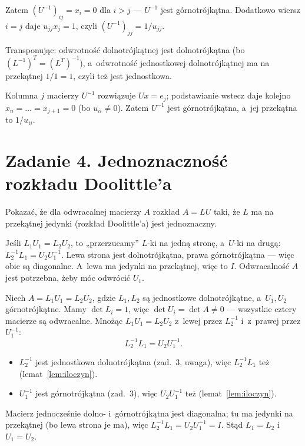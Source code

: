 \documentclass[11pt]{article}
\begin{document}
Zatem $(U^{-1})_{ij}=x_i=0$ dla $i>j$ --- $U^{-1}$ jest górnotrójkątna.
Dodatkowo wiersz $i=j$ daje $u_{jj}x_j=1$, czyli $(U^{-1})_{jj}=1/u_{jj}$.

\begin{uwaga}
Transponując: odwrotność dolnotrójkątnej jest dolnotrójkątna (bo
$(L^{-1})^T=(L^T)^{-1}$), a~odwrotność jednostkowej dolnotrójkątnej
ma na przekątnej $1/1=1$, czyli też jest jednostkowa.
\end{uwaga}

\begin{odpowiedz}
Kolumna $j$ macierzy $U^{-1}$ rozwiązuje $Ux=e_j$; podstawianie wstecz
daje kolejno $x_n=\dots=x_{j+1}=0$ (bo $u_{ii}\ne0$). Zatem $U^{-1}$ jest
górnotrójkątna, a~jej przekątna to $1/u_{ii}$.
\end{odpowiedz}

\section{Zadanie 4. Jednoznaczność rozkładu Doolittle'a}
\begin{tresc}
Pokazać, że dla odwracalnej macierzy $A$ rozkład $A=LU$ taki, że $L$ ma
na przekątnej jedynki (rozkład Doolittle'a) jest jednoznaczny.
\end{tresc}

\begin{intuicja}
Jeśli $L_1U_1=L_2U_2$, to „przerzucamy” $L$-ki na jedną stronę,
a~$U$-ki na drugą: $L_2^{-1}L_1=U_2U_1^{-1}$. Lewa strona jest dolnotrójkątna,
prawa górnotrójkątna --- więc obie są diagonalne. A~lewa ma jedynki na
przekątnej, więc to $I$. Odwracalność $A$ jest potrzebna, żeby móc odwrócić
$U_1$.
\end{intuicja}

\formalnie
Niech $A=L_1U_1=L_2U_2$, gdzie $L_1,L_2$ są jednostkowe dolnotrójkątne,
a~$U_1,U_2$ górnotrójkątne. Mamy $\det L_i=1$, więc
$\det U_i=\det A\ne0$ --- wszystkie cztery macierze są odwracalne.
Mnożąc $L_1U_1=L_2U_2$ z~lewej przez $L_2^{-1}$ i~z~prawej przez $U_1^{-1}$:
\[
L_2^{-1}L_1=U_2U_1^{-1}.
\]
\begin{itemize}
\item $L_2^{-1}$ jest jednostkowa dolnotrójkątna (zad.~3, uwaga), więc
$L_2^{-1}L_1$ też (lemat~\ref{lem:iloczyn}).
\item $U_1^{-1}$ jest górnotrójkątna (zad.~3), więc $U_2U_1^{-1}$ też
(lemat~\ref{lem:iloczyn}).
\end{itemize}
Macierz jednocześnie dolno- i~górnotrójkątna jest diagonalna; tu ma
jedynki na przekątnej (bo lewa strona je ma), więc
$L_2^{-1}L_1=U_2U_1^{-1}=I$. Stąd $L_1=L_2$ i~$U_1=U_2$.
\end{document}
